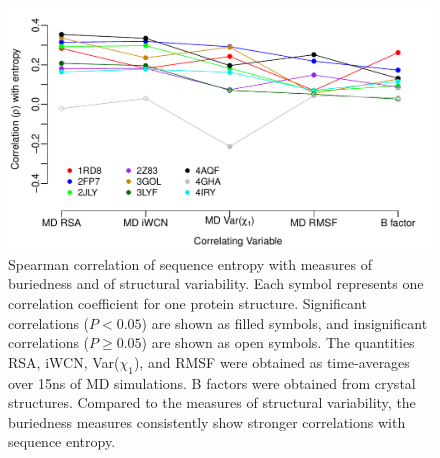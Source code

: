 \documentclass[smallextended]{svjour3}
\begin{document}
\begin{figure}[tbh]
\begin{center}
    \includegraphics[width=5in]{cor_entropy_all.pdf}
\end{center}
\caption{Spearman correlation of sequence entropy with measures of buriedness and of structural variability. Each symbol represents one correlation coefficient for one protein structure. Significant correlations ($P<0.05$) are shown as filled symbols, and insignificant correlations ($P\geq0.05$) are shown as open symbols. The quantities RSA, iWCN, Var($\chi_1$), and RMSF were obtained as time-averages over 15ns of MD simulations. B factors were obtained from crystal structures. Compared to the measures of structural variability, the buriedness measures consistently show stronger correlations with sequence entropy.}
\label{fig:cor_entropy_all}
\end{figure}
\end{document}
